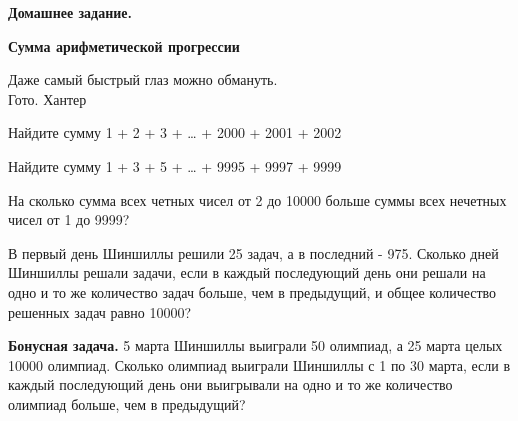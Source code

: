 \hspace{3mm}

\centerline{\bf \Huge Домашнее задание.}
\centerline{\bf \Huge Сумма арифметической прогрессии}

\begin{flushright}
    \scriptsize{Даже самый быстрый глаз можно обмануть. \\Гото. Хантер}
\end{flushright}


 Найдите сумму 1 + 2 + 3 + … + 2000 + 2001 + 2002

 Найдите сумму 1 + 3 + 5 + … + 9995 + 9997 + 9999

 На сколько сумма всех четных чисел от 2 до 10000 больше суммы всех нечетных чисел от 1 до 9999?

 В первый день Шиншиллы решили 25 задач, а в последний - 975. Сколько дней Шиншиллы решали задачи, если в каждый последующий день они решали на одно и то же количество задач больше, чем в предыдущий, и общее количество решенных задач равно 10000?

\textbf{Бонусная задача.} 5 марта Шиншиллы выиграли 50 олимпиад, а 25 марта целых 10000 олимпиад. Сколько олимпиад выиграли Шиншиллы с 1 по 30 марта, если в каждый последующий день они выигрывали на одно и то же количество олимпиад больше, чем в предыдущий?